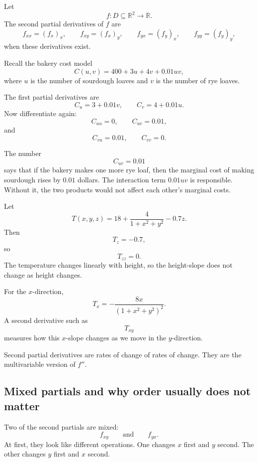 \begin{definition}
Let
\[
    f:D\subseteq\mathbb R^2\to\mathbb R.
\]
The second partial derivatives of \(f\) are
\[
    f_{xx}=(f_x)_x,
    \qquad
    f_{xy}=(f_x)_y,
    \qquad
    f_{yx}=(f_y)_x,
    \qquad
    f_{yy}=(f_y)_y,
\]
when these derivatives exist.
\end{definition}

\begin{example}
Recall the bakery cost model
\[
    C(u,v)=400+3u+4v+0.01uv,
\]
where \(u\) is the number of sourdough loaves and \(v\) is the number of rye loaves.

The first partial derivatives are
\[
    C_u=3+0.01v,
    \qquad
    C_v=4+0.01u.
\]
Now differentiate again:
\[
    C_{uu}=0,
    \qquad
    C_{uv}=0.01,
\]
and
\[
    C_{vu}=0.01,
    \qquad
    C_{vv}=0.
\]

The number
\[
    C_{uv}=0.01
\]
says that if the bakery makes one more rye loaf, then the marginal cost of making
sourdough rises by \(0.01\) dollars.  The interaction term \(0.01uv\) is responsible.
Without it, the two products would not affect each other's marginal costs.
\end{example}

\begin{example}
Let
\[
    T(x,y,z)=18+\frac{4}{1+x^2+y^2}-0.7z.
\]
Then
\[
    T_z=-0.7,
\]
so
\[
    T_{zz}=0.
\]
The temperature changes linearly with height, so the height-slope does not change as
height changes.

For the \(x\)-direction,
\[
    T_x=-\frac{8x}{(1+x^2+y^2)^2}.
\]
A second derivative such as
\[
    T_{xy}
\]
measures how this \(x\)-slope changes as we move in the \(y\)-direction.
\end{example}

Second partial derivatives are rates of change of rates of change.  They are the
multivariable version of \(f''\).

\subsection{Mixed partials and why order usually does not matter}

Two of the second partials are mixed:
\[
    f_{xy}
    \qquad\text{and}\qquad
    f_{yx}.
\]
At first, they look like different operations.  One changes \(x\) first and \(y\) second.
The other changes \(y\) first and \(x\) second.

